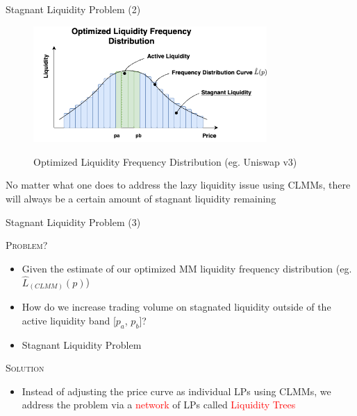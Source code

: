 \documentclass[10pt,xcolor=svgnames]{beamer} %
\newcommand{\red}[1]{\textcolor{red}{#1}}
\begin{document}
\begin{frame}{Stagnant Liquidity Problem (2)} 


\begin{figure}[h!]
\includegraphics[width=3.5in]{img/slp.png}
\label{fig:uniswap_v3}
\caption{Optimized Liquidity Frequency Distribution (eg. Uniswap v3)} 
\end{figure}

No matter what one does to address the lazy liquidity issue using CLMMs, there will always be a certain amount of stagnant liquidity remaining  

\end{frame}


\begin{frame}{Stagnant Liquidity Problem (3)} 

\begin{exampleblock}{\textsc{Problem?}}
\begin{itemize}
  \item Given the estimate of our optimized MM liquidity frequency distribution (eg. $\hat{L}_{(CLMM)}(p)$)
  \item How do we increase trading volume on stagnated liquidity outside of the active liquidity band [$p_{a}$, $p_{b}$]?
  \item Stagnant Liquidity Problem
\end{itemize}
\end{exampleblock}

\begin{exampleblock}{\textsc{Solution}}
\begin{itemize}
  \item Instead of adjusting the price curve as individual LPs using CLMMs, we address the problem via a \red{network} of LPs called \red{Liquidity Trees}
\end{itemize}
\end{exampleblock}

\vspace{7cm}

\end{frame}
\end{document}

